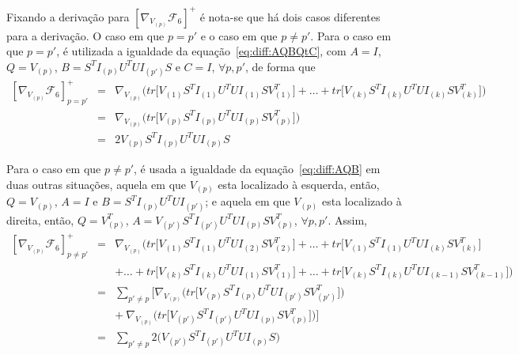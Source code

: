 \documentclass[
    12pt,                %
    oneside,            %
    a4paper,            %
    english,            %
    brazil                %
    ]{abntex2ppgsi}
\begin{document}
Fixando a derivação para $[\nabla_{V_{(p)}} \mathcal{F}_6]^+$ é nota-se que há dois casos diferentes para a derivação. O caso em que $p = p'$ e o caso em que $p \neq p'$. Para o caso em que $p = p'$, é utilizada a igualdade da equação~\ref{eq:diff:AQBQtC}, com $A = I$, $Q = V_{(p)}$, $B = S^T I_{(p)} U^T U I_{(p')} S$ e $C = I$, $\forall p, p'$, de forma que
\[
    \begin{array}{lcl}
        [\nabla_{V_{(p)}} \mathcal{F}_6]^{+}_{p=p'} & = & \nabla_{V_{(p)}} \Big( tr\big[ V_{(1)} S^T I_{(1)} U^T U I_{(1)} S V_{(1)}^T \big] + \dots + tr\big[ V_{(k)} S^T I_{(k)} U^T U I_{(k)} S V_{(k)}^T \big] \Big) \\
                                                    & = & \nabla_{V_{(p)}} \Big( tr\big[ V_{(p)} S^T I_{(p)} U^T U I_{(p)} S V_{(p)}^T \big] \Big)  \\
                                                    & = & 2 V_{(p)} S^T I_{(p)} U^T U I_{(p)} S
    \end{array}
\]

Para o caso em que $p \neq p'$, é usada a igualdade da equação~\ref{eq:diff:AQB} em duas outras situações, aquela em que $V_{(p)}$ esta localizado à esquerda, então, $Q = V_{(p)}$, $A = I$ e $B = S^T I_{(p)} U^T U I_{(p')}$; e aquela em que $V_{(p)}$ esta localizado à direita, então, $Q = V_{(p)}^T$, $A = V_{(p')} S^T I_{(p')} U^T U I_{(p)} S V_{(p)}^T$, $\forall p, p'$. Assim,
\[
    \begin{array}{lcl}
        [\nabla_{V_{(p)}} \mathcal{F}_6]^{+}_{p \neq p'} & = & \nabla_{V_{(p)}} \Big( tr\big[ V_{(1)} S^T I_{(1)} U^T U I_{(2)} S V_{(2)}^T \big] + \dots + tr\big[ V_{(1)} S^T I_{(1)} U^T U I_{(k)} S V_{(k)}^T \big] \\
                                   &   & + \dots + tr\big[ V_{(k)} S^T I_{(k)} U^T U I_{(1)} S V_{(1)}^T \big] + \dots + tr\big[ V_{(k)} S^T I_{(k)} U^T U I_{(k-1)} S V_{(k-1)}^T \big] \Big) \\
                                   & = & \sum_{p' \neq p} \bigg[ \nabla_{V_{(p)}} \Big( tr\big[ V_{(p)} S^T I_{(p)} U^T U I_{(p')} S V_{(p')}^T \big] \Big) \\
                                   &   & + ~ \nabla_{V_{(p)}} \Big( tr\big[ V_{(p')} S^T I_{(p')} U^T U I_{(p)} S V_{(p)}^T \big] \Big) \bigg] \\
                                   & = & \sum_{p' \neq p} 2 \big( V_{(p')} S^T I_{(p')} U^T U I_{(p)} S \big)
    \end{array}
\]
\end{document}
